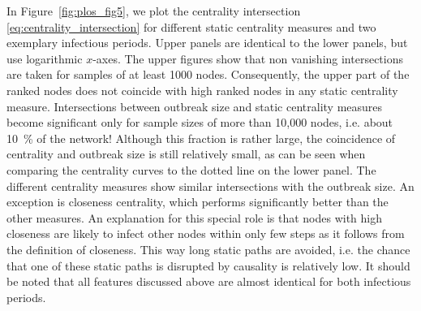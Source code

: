 In Figure~\ref{fig:plos_fig5}, we plot the centrality intersection \eqref{eq:centrality_intersection} for different static centrality measures and two exemplary infectious periods.
Upper panels are identical to the lower panels, but use logarithmic $x$-axes. 
The upper figures show that non vanishing intersections are taken for samples of at least 1000 nodes.
Consequently, the upper part of the ranked nodes does not coincide with high ranked nodes in any static centrality measure.
Intersections between outbreak size and static centrality measures become significant only for sample sizes of more than 10,000 nodes, i.e. about 10~\% of the network!
Although this fraction is rather large, the coincidence of centrality and outbreak size is still relatively small, as can be seen when comparing the centrality curves to the dotted line on the lower panel.
The different centrality measures show similar intersections with the outbreak size.
An exception is closeness centrality, which performs significantly better than the other measures.
An explanation for this special role is that nodes with high closeness are likely to infect other nodes within only few steps as it follows from the definition of closeness.
This way long static paths are avoided, i.e. the chance that one of these static paths is disrupted by causality is relatively low.
It should be noted that all features discussed above are almost identical for both infectious periods.

